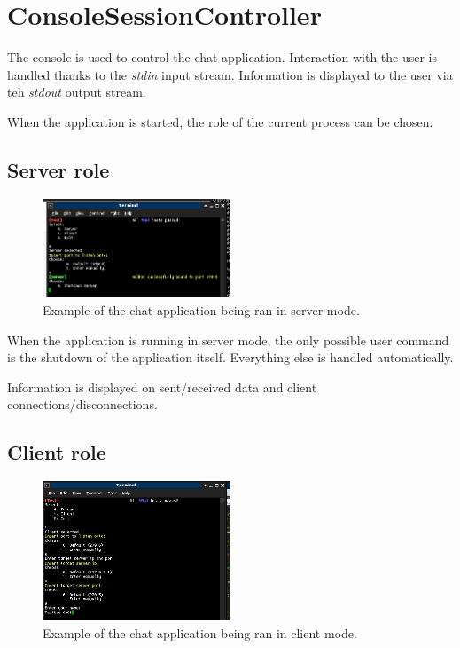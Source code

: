 \documentclass{report}
\begin{document}
        \section{ConsoleSessionController}
            
            The console is used to control the chat application. 
            Interaction with the user is handled thanks to the \emph{stdin} input stream.
            Information is displayed to the user via teh \emph{stdout} output stream.

            When the application is started, the role of the current process can be chosen.

            \subsection{Server role}

                \begin{figure}[h]
                \caption{Example of the chat application being ran in server mode.}
                \centering
                \includegraphics[width=0.5\textwidth]{screen1}
                \end{figure}

                When the application is running in server mode, the only possible user command is the shutdown of the application itself.
                Everything else is handled automatically.

                Information is displayed on sent/received data and client connections/disconnections.

\newpage

            \subsection{Client role}
        
                \begin{figure}[h]
                \caption{Example of the chat application being ran in client mode.}
                \centering
                \includegraphics[width=0.5\textwidth]{screen2}
                \end{figure}
\end{document}
